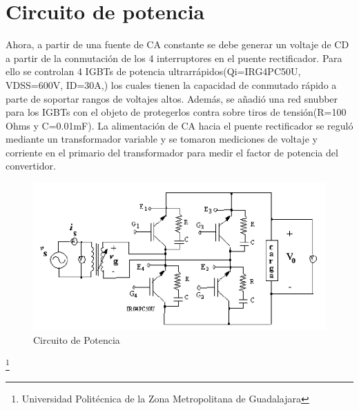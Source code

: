 \documentclass[12pt,a4paper]{article}
\begin{document}
\section{Circuito de potencia}
Ahora, a partir de una fuente de CA constante se debe
generar un voltaje de CD a partir de la conmutación de los 4 interruptores en el puente rectificador. Para ello se controlan 4 IGBTs de potencia ultrarrápidos(Qi=IRG4PC50U, VDSS=600V, ID=30A,) los cuales tienen la capacidad de conmutado rápido a parte de soportar rangos de voltajes altos. Además, se añadió una red snubber para los IGBTs con el objeto de protegerlos contra sobre tiros de tensión(R=100 Ohms y C=0.01mF). La alimentación de CA hacia el puente rectificador se reguló mediante un transformador variable y se tomaron mediciones de voltaje y corriente en el primario del transformador para medir el factor de potencia del convertidor.\\
\begin{figure}[hbtp]
\centering
\includegraphics[scale=0.67]{Pictures/Circuito.PNG}
\caption{Circuito de Potencia}
\end{figure}

\footnote{Universidad Politécnica de la Zona Metropolitana de Guadalajara}

\newpage
\end{document}
